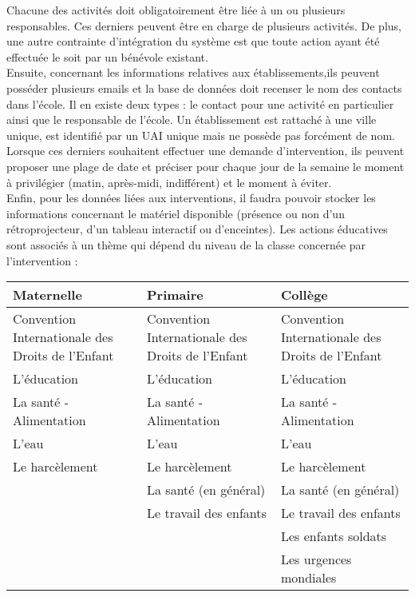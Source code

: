 Chacune des activités doit obligatoirement être liée à un ou plusieurs responsables. Ces derniers peuvent être en charge de plusieurs activités. De plus, une autre contrainte d'intégration du système est que toute action ayant été effectuée le soit par un bénévole existant. \\

Ensuite, concernant les informations relatives aux établissements,ils peuvent posséder plusieurs emails et la base de données doit recenser le nom des contacts dans l'école. Il en existe deux types : le contact pour une activité en particulier ainsi que le responsable de l'école. Un établissement est rattaché à une ville unique, est identifié par un UAI unique mais ne possède pas forcément de nom. Lorsque ces derniers souhaitent effectuer une demande d'intervention, ils peuvent proposer une plage de date et préciser pour chaque jour de la semaine le moment à privilégier (matin, après-midi, indifférent) et le moment à éviter. \\

Enfin, pour les données liées aux interventions, il faudra pouvoir stocker les informations concernant le matériel disponible (présence ou non d'un rétroprojecteur, d'un tableau interactif ou d'enceintes). Les actions éducatives sont associés à un thème qui dépend du niveau de la classe concernée par l'intervention :

\begin{tabular}{|p{5cm}|p{5cm}|p{5cm}|}
  \hline
  Maternelle & Primaire & Collège \\
  \hline
  Convention Internationale des Droits de l'Enfant & Convention Internationale des Droits de l'Enfant & Convention Internationale des Droits de l'Enfant \\
  \hline
  L'éducation & L'éducation & L'éducation \\
  \hline
  La santé - Alimentation & La santé - Alimentation & La santé - Alimentation \\
  \hline
  L'eau & L'eau & L'eau \\
  \hline
  Le harcèlement & Le harcèlement & Le harcèlement \\
  \hline
  & La santé (en général) & La santé (en général) \\
  \hline
  & Le travail des enfants & Le travail des enfants \\
  \hline
  & & Les enfants soldats \\
  \hline
  & & Les urgences mondiales \\
  \hline
\end{tabular}

